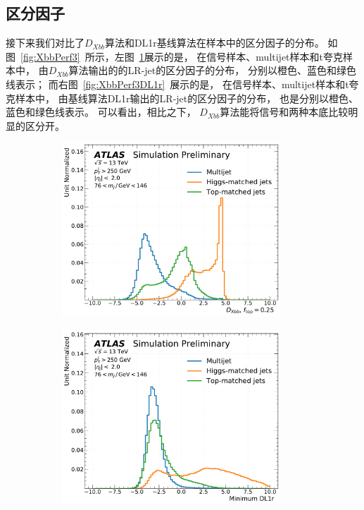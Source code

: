 \subsection{区分因子}
\label{sec:XbbPerf3}



接下来我们对比了$D_{Xbb}$算法和DL1r基线算法在样本中的区分因子的分布。
如图~\ref{fig:XbbPerf3}~所示，左图~\ref{fig:XbbPerf3DXBB}展示的是，
在信号样本、multijet样本和t夸克样本中，
由$D_{Xbb}$算法输出的的LR-jet的区分因子的分布，
分别以橙色、蓝色和绿色线表示；
而右图~\ref{fig:XbbPerf3DL1r}~展示的是，
在信号样本、multijet样本和t夸克样本中，
由基线算法DL1r输出的LR-jet的区分因子的分布，
也是分别以橙色、蓝色和绿色线表示。
可以看出，相比之下，
$D_{Xbb}$算法能将信号和两种本底比较明显的区分开。

\begin{figure}[!thbp]
  \begin{subfigure}{.5\textwidth}
  \centering
  \includegraphics[width=0.9\textwidth]{figuresXbb/samples/Hbb_025_norm.pdf}
  \caption{}
  \label{fig:XbbPerf3DXBB}
  \end{subfigure}
  \begin{subfigure}{.5\textwidth}
  \centering
  \includegraphics[width=0.9\textwidth]{figuresXbb/samples/dl1r_norm.pdf}

\end{subfigure}
\end{figure}
